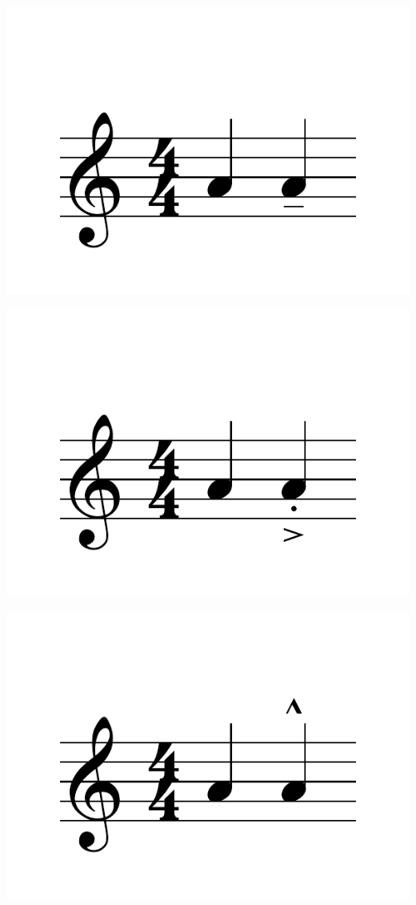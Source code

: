 \documentclass{article}
\begin{document}
\includegraphics[scale=0.5]{figures_tests/pdf/skern/articulations3.pdf}

\includegraphics[scale=0.5]{figures_tests/pdf/skern/articulations4.pdf}

\includegraphics[scale=0.5]{figures_tests/pdf/skern/articulations5.pdf}
\end{document}
